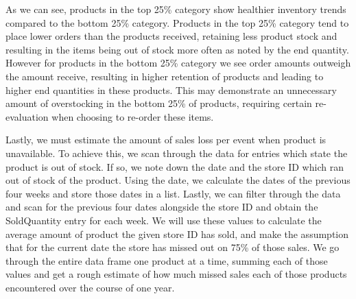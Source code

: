 As we can see, products in the top 25\% category show healthier inventory trends compared to the bottom 25\% category. Products in the top 25\%  category tend to place lower orders than the products received, retaining less product stock and resulting in the items being out of stock more  often as noted by the end quantity. However for products in the bottom 25\% category we see order amounts outweigh the amount receive,  resulting in higher retention of products and leading to higher end quantities in these products. This may demonstrate an unnecessary amount of  overstocking in the bottom 25\% of products, requiring certain re-evaluation when choosing to re-order these items.

Lastly, we must estimate the amount of sales loss per event when product is unavailable. To achieve this, we scan through the data for entries  which state the product is out of stock. If so, we note down the date and the store ID which ran out of stock of the product. Using the date, we  calculate the dates of the previous four weeks and store those dates in a list. Lastly, we can filter through the data and scan for the previous four  dates alongside the store ID and obtain the SoldQuantity entry for each week. We will use these values to calculate the average amount of  product the given store ID has sold, and make the assumption that for the current date the store has missed out on 75\% of those sales. We go  through the entire data frame one product at a time, summing each of those values and get a rough estimate of how much missed sales each of  those products encountered over the course of one year. 
